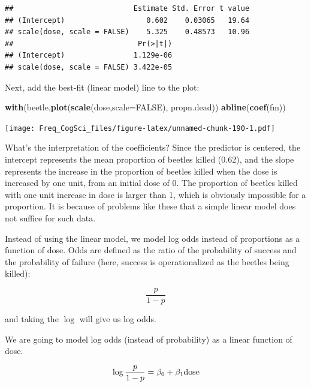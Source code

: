 \documentclass[12pt,]{krantz}
\newenvironment{Shaded}{\begin{snugshade}}{\end{snugshade}}
\newcommand{\DataTypeTok}[1]{\textcolor[rgb]{0.13,0.29,0.53}{#1}}
\newcommand{\KeywordTok}[1]{\textcolor[rgb]{0.13,0.29,0.53}{\textbf{#1}}}
\newcommand{\NormalTok}[1]{#1}
\newcommand{\OtherTok}[1]{\textcolor[rgb]{0.56,0.35,0.01}{#1}}
\begin{document}
\begin{verbatim}
##                            Estimate Std. Error t value
## (Intercept)                   0.602    0.03065   19.64
## scale(dose, scale = FALSE)    5.325    0.48573   10.96
##                             Pr(>|t|)
## (Intercept)                1.129e-06
## scale(dose, scale = FALSE) 3.422e-05
\end{verbatim}

Next, add the best-fit (linear model) line to the plot:

\begin{Shaded}
\begin{Highlighting}[]
\KeywordTok{with}\NormalTok{(beetle,}\KeywordTok{plot}\NormalTok{(}\KeywordTok{scale}\NormalTok{(dose,}\DataTypeTok{scale=}\OtherTok{FALSE}\NormalTok{),}
\NormalTok{                 propn.dead))}
\KeywordTok{abline}\NormalTok{(}\KeywordTok{coef}\NormalTok{(fm))}
\end{Highlighting}
\end{Shaded}

\texttt{[image: Freq\_CogSci\_files/figure-latex/unnamed-chunk-190-1.pdf]}

What's the interpretation of the coefficients? Since the predictor is centered, the intercept represents the mean proportion of beetles killed (0.62), and the slope represents the increase in the proportion of beetles killed when the dose is increased by one unit, from an initial dose of 0. The proportion of beetles killed with one unit increase in dose is larger than 1, which is obviously impossible for a proportion. It is because of problems like these that a simple linear model does not suffice for such data.

Instead of using the linear model, we model log odds instead of proportions as a function of dose. Odds are defined as the ratio of the probability of success and the probability of failure (here, success is operationalized as the beetles being killed):

\begin{equation}
\frac{p}{1-p}
\end{equation}

and taking the \(\log\) will give us log odds.

We are going to model log odds (instead of probability) as a linear function of dose.

\begin{equation}
\log \frac{p}{1-p} = \beta_0 + \beta_1 \hbox{dose}
\end{equation}
\end{document}
